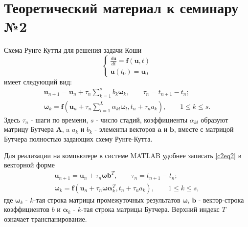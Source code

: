 \section{Теоретический материал к семинару №2}
Схема Рунге-Кутты для решения задачи Коши
\begin{equation} \label{c2eq1}
	\begin{cases}
		\displaystyle \frac{d\mathbf{u}}{dt} = \mathbf{f} \left( \mathbf{u}, t \right) \\
		\mathbf{u}(t_0) = \mathbf{u}_0
	\end{cases}
\end{equation}
имеет следующий вид:
\begin{equation} \label{c2eq2}
	\begin{split}
		\mathbf{u}_{n+1} = \mathbf{u}_n + \tau_n \sum_{k=1}^{s} b_k \boldsymbol{\omega}_k, 
	\qquad
		\tau_n = t_{n+1} - t_n; \\
		\boldsymbol{\omega}_k = \mathbf{f} \left( \mathbf{u}_n + \tau_n \sum_{l=1}^{L} \alpha_{kl} \boldsymbol{\omega}_l, t_n + \tau_n a_k \right),
	\qquad
		1 \le k \le s.
	\end{split}
\end{equation}
Здесь $\tau_n$ - шаги по времени, $s$ - число стадий, коэффициенты $\alpha_{kl}$ образуют матрицу Бутчера $\mathbf{A}$, a $a_k$ и $b_k$ - элементы векторов $\mathbf{a}$ и $\mathbf{b}$, вместе с матрицой Бутчера полностью задающих схему Рунге-Кутта.

Для реализации на компьютере в системе MATLAB удобнее записать \eqref{c2eq2} в векторной форме
\begin{equation} \label{c2eq3}
	\begin{split}
		\mathbf{u}_{n+1} = \mathbf{u}_n + \tau_n \boldsymbol{\omega} \mathbf{b}^T,
	\qquad
		\tau_n = t_{n+1} - t_n; \\
		\boldsymbol{\omega}_k = \mathbf{f} \left( \mathbf{u}_n + \tau_n \boldsymbol{\omega} \boldsymbol{\alpha}^T_k, t_n + \tau_n a_k \right),
	\qquad
		1 \le k \le s,
	\end{split} 
\end{equation}
где $\boldsymbol{\omega}_k$ - $k$-тая строка матрицы промежуточных результатов $\boldsymbol{\omega}$, $\mathbf{b}$ - вектор-строка коэффициентов $b$ и $\boldsymbol{\alpha}_k$ - $k$-тая строка матрицы Бутчера. Верхний индекс $T$ означает транспанирование.

